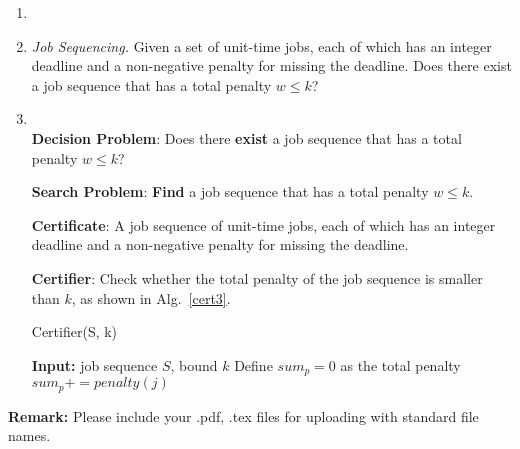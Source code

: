 \documentclass[12pt,a4paper]{article}
\makeatletter
\newtheorem*{solution}{Solution}
\theoremstyle{definition}
\renewenvironment{solution}[1][Solution] {\par\pushQED{\qed}\normalfont\topsep6\p@\@plus6\p@\relax\trivlist\item[\hskip\labelsep\bfseries#1\@addpunct{.}]\ignorespaces}{\popQED\endtrivlist\@endpefalse} \makeatother
\makeatother
\begin{document}
\begin{enumerate}
\begin{enumerate}
\begin{solution}
\begin{center}
\begin{algorithm}[H]
	        \label{cert2}
	        
	        \end{algorithm}
	    \end{center}
	    
	    \end{solution}
	    \item
	    \textit{Job Sequencing.} Given a set of unit-time jobs, each of which has an integer deadline and a non-negative penalty for missing the deadline. Does there exist a job sequence that has a total penalty $w\leqslant k$?
	     \begin{solution}
	    ~\\
	    \textbf{Decision Problem}: Does there \textbf{exist} a job sequence that has a total penalty $w\leqslant k$?
	    
	    \textbf{Search Problem}: \textbf{Find} a job sequence that has a total penalty $w\leqslant k$.
	    
	   
	    
	    \textbf{Certificate}: A job sequence of unit-time jobs, each of which has an integer deadline and a non-negative penalty for missing the deadline.
	    
	    \textbf{Certifier}: Check whether the total penalty of the job sequence is smaller than $k$, as shown in Alg.~\ref{cert3}.
	    
	    \begin{center}
	        \begin{algorithm}[H]
	        \caption{Certifier(S, k)}
	        \label{cert3}
	        \textbf{Input:} job sequence $S$, bound $k$\;
	        Define $sum_p=0$ as the total penalty\;
	        {
	        {$sum_p += penalty(j) $
	        }
	        }
	        
	        \end{algorithm}
	    \end{center}
	    \end{solution}
	\end{enumerate}
\end{enumerate}

\textbf{Remark:} Please include your .pdf, .tex files for uploading with standard file names.
\newpage


\end{document}
